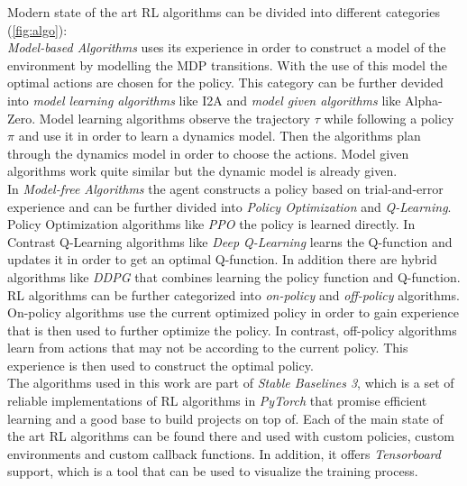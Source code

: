 Modern state of the art RL algorithms can be divided into different categories (\cref{fig:algo}):\\
\emph{Model-based Algorithms} uses its experience in order to construct a model of the environment by modelling the MDP transitions. With the use of this model the optimal actions are chosen for the policy. This category can be further devided into \emph{model learning algorithms} like I2A and \emph{model given algorithms} like Alpha-Zero. Model learning algorithms observe the trajectory $\tau$ while following a policy $\pi$ and use it in order to learn a dynamics model. Then the algorithms plan through the dynamics model in order to choose the actions.
Model given algorithms work quite similar but the dynamic model is already given.\\
In \emph{Model-free Algorithms} the agent constructs a policy based on trial-and-error experience and can be further divided into \emph{Policy Optimization} and \emph{Q-Learning}.
Policy Optimization algorithms like \emph{PPO} the policy is learned directly. In Contrast Q-Learning algorithms like \emph{Deep Q-Learning} learns the Q-function and updates it in order to get an optimal Q-function. In addition there are hybrid algorithms like \emph{DDPG} that combines learning the policy function and Q-function.\\
RL algorithms can be further categorized into \emph{on-policy} and \emph{off-policy} algorithms. On-policy algorithms use the current optimized policy in order to gain experience that is then used to further optimize the policy. In contrast, off-policy algorithms learn from actions that may not be according to the current policy. This experience is then used to construct the optimal policy.\\
The algorithms used in this work are part of \emph{Stable Baselines 3}\cite{stable-baselines3}, which is a set of reliable implementations of RL algorithms in \emph{PyTorch} that promise efficient learning and a good base to build projects on top of. Each of the main state of the art RL algorithms can be found there and used with custom policies, custom environments and custom callback functions. In addition, it offers \emph{Tensorboard} support, which is a tool that can be used to visualize the training process.

\newpage
